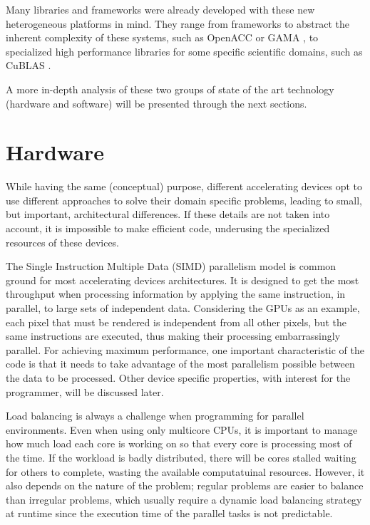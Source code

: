 Many libraries and frameworks were already developed with these new heterogeneous platforms in mind. They range from frameworks to abstract the inherent complexity of these systems, such as OpenACC \cite{OpenACC} or GAMA \cite{GAMA}, to specialized high performance libraries for some specific scientific domains, such as CuBLAS \cite{NVIDIA:CuBLAS}.

A more in-depth analysis of these two groups of state of the art technology (hardware and software) will be presented through the next sections.

\section{Hardware}

While having the same (conceptual) purpose, different accelerating devices opt to use different approaches to solve their domain specific problems, leading to small, but important, architectural differences. If these details are not taken into account, it is impossible to make efficient code, underusing the specialized resources of these devices.

The Single Instruction Multiple Data (SIMD) parallelism model is common ground for most accelerating devices architectures. It is designed to get the most throughput when processing information by applying the same instruction, in parallel, to large sets of independent data. Considering the GPUs as an example, each pixel that must be rendered is independent from all other pixels, but the same instructions are executed, thus making their processing embarrassingly parallel. For achieving maximum performance, one important characteristic of the code is that it needs to take advantage of the most parallelism possible between the data to be processed. Other device specific properties, with interest for the programmer, will be discussed later.

Load balancing is always a challenge when programming for parallel environments. Even when using only multicore CPUs, it is important to manage how much load each core is working on so that every core is processing most of the time. If the workload is badly distributed, there will be cores stalled waiting for others to complete, wasting the available computatuinal resources. However, it also depends on the nature of the problem; regular problems are easier to balance than irregular problems, which usually require a dynamic load balancing strategy at runtime since the execution time of the parallel tasks is not predictable.


